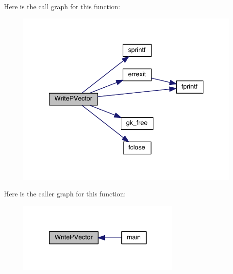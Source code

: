 Here is the call graph for this function\+:\nopagebreak
\begin{figure}[H]
\begin{center}
\leavevmode
\includegraphics[width=320pt]{a00861_a19b5376612558b2381990f2e7a06bffc_cgraph}
\end{center}
\end{figure}
Here is the caller graph for this function\+:\nopagebreak
\begin{figure}[H]
\begin{center}
\leavevmode
\includegraphics[width=230pt]{a00861_a19b5376612558b2381990f2e7a06bffc_icgraph}
\end{center}
\end{figure}
